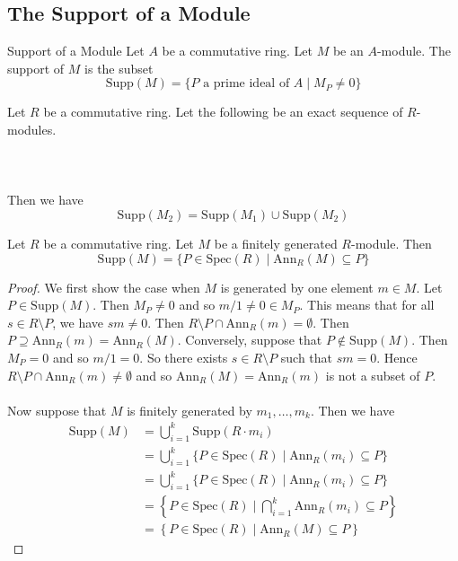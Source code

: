 \documentclass[a4paper]{article}
\begin{document}
\subsection{The Support of a Module}
\begin{defn}{Support of a Module}{} Let $A$ be a commutative ring. Let $M$ be an $A$-module. The support of $M$ is the subset $$\text{Supp}(M)=\{P\text{ a prime ideal of }A\;|\;M_P\neq 0\}$$
\end{defn}

\begin{lmm}{}{} Let $R$ be a commutative ring. Let the following be an exact sequence of $R$-modules. \\~\\
\\~\\
Then we have $$\text{Supp}(M_2)=\text{Supp}(M_1)\cup\text{Supp}(M_2)$$
\end{lmm}

\begin{prp}{}{} Let $R$ be a commutative ring. Let $M$ be a finitely generated $R$-module. Then $$\text{Supp}(M)=\{P\in\text{Spec}(R)\;|\;\text{Ann}_R(M)\subseteq P\}$$ \tcbline
\begin{proof}
We first show the case when $M$ is generated by one element $m\in M$. Let $P\in\text{Supp}(M)$. Then $M_P\neq 0$ and so $m/1\neq 0\in M_P$. This means that for all $s\in R\setminus P$, we have $sm\neq 0$. Then $R\setminus P\cap\text{Ann}_R(m)=\emptyset$. Then $P\supseteq\text{Ann}_R(m)=\text{Ann}_R(M)$. Conversely, suppose that $P\notin\text{Supp}(M)$. Then $M_P=0$ and so $m/1=0$. So there exists $s\in R\setminus P$ such that $sm=0$. Hence $R\setminus P\cap\text{Ann}_R(m)\neq\emptyset$ and so $\text{Ann}_R(M)=\text{Ann}_R(m)$ is not a subset of $P$. \\~\\

Now suppose that $M$ is finitely generated by $m_1,\dots,m_k$. Then we have 
\begin{align*}
\text{Supp}(M)&=\bigcup_{i=1}^k\text{Supp}(R\cdot m_i)\\
&=\bigcup_{i=1}^k\{P\in\text{Spec}(R)\;|\;\text{Ann}_R(m_i)\subseteq P\}\\
&=\bigcup_{i=1}^k\{P\in\text{Spec}(R)\;|\;\text{Ann}_R(m_i)\subseteq P\}\\
&=\left\{P\in\text{Spec}(R)\;|\;\bigcap_{i=1}^k\text{Ann}_R(m_i)\subseteq P\right\}\tag{lmm1.1.2}\\
&=\left\{P\in\text{Spec}(R)\;|\;\text{Ann}_R(M)\subseteq P\right\}
\end{align*}
\end{proof}
\end{prp}
\end{document}
